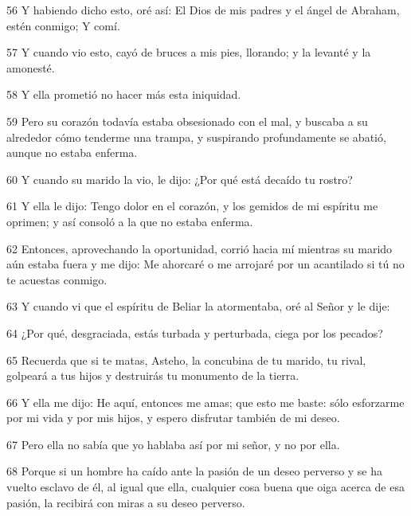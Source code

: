 \par 56 Y habiendo dicho esto, oré así: El Dios de mis padres y el ángel de Abraham, estén conmigo; Y comí.

\par 57 Y cuando vio esto, cayó de bruces a mis pies, llorando; y la levanté y la amonesté.

\par 58 Y ella prometió no hacer más esta iniquidad.

\par 59 Pero su corazón todavía estaba obsesionado con el mal, y buscaba a su alrededor cómo tenderme una trampa, y suspirando profundamente se abatió, aunque no estaba enferma.

\par 60 Y cuando su marido la vio, le dijo: ¿Por qué está decaído tu rostro?

\par 61 Y ella le dijo: Tengo dolor en el corazón, y los gemidos de mi espíritu me oprimen; y así consoló a la que no estaba enferma.

\par 62 Entonces, aprovechando la oportunidad, corrió hacia mí mientras su marido aún estaba fuera y me dijo: Me ahorcaré o me arrojaré por un acantilado si tú no te acuestas conmigo.

\par 63 Y cuando vi que el espíritu de Beliar la atormentaba, oré al Señor y le dije:

\par 64 ¿Por qué, desgraciada, estás turbada y perturbada, ciega por los pecados?

\par 65 Recuerda que si te matas, Asteho, la concubina de tu marido, tu rival, golpeará a tus hijos y destruirás tu monumento de la tierra.

\par 66 Y ella me dijo: He aquí, entonces me amas; que esto me baste: sólo esforzarme por mi vida y por mis hijos, y espero disfrutar también de mi deseo.

\par 67 Pero ella no sabía que yo hablaba así por mi señor, y no por ella.

\par 68 Porque si un hombre ha caído ante la pasión de un deseo perverso y se ha vuelto esclavo de él, al igual que ella, cualquier cosa buena que oiga acerca de esa pasión, la recibirá con miras a su deseo perverso.

